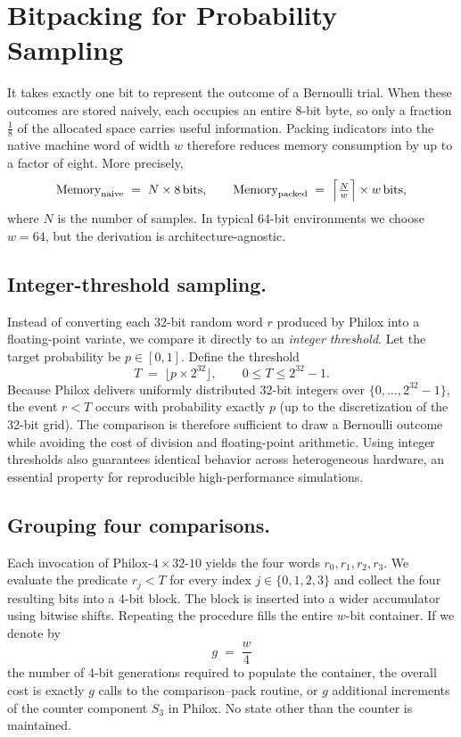 \section{Bitpacking for Probability Sampling}
\label{sec:bitpack-prob-sampling}

It takes exactly one bit to represent the outcome of a Bernoulli trial. When these outcomes are stored naively, each occupies an entire \(8\)-bit byte, so only a fraction \(\tfrac{1}{8}\) of the allocated space carries useful information. Packing indicators into the native machine word of width \(w\) therefore reduces memory consumption by up to a factor of eight. More precisely,
\[
  \text{Memory}_{\text{naive}} \;=\; N \times 8\,\text{bits},
  \qquad
  \text{Memory}_{\text{packed}} \;=\;\Bigl\lceil\tfrac{N}{w}\Bigr\rceil \times w\,\text{bits},
\]
where \(N\) is the number of samples. In typical 64-bit environments we choose \(w = 64\), but the derivation is architecture-agnostic.

\subsection{Integer-threshold sampling.}  Instead of converting each 32-bit random word \(r\) produced by Philox into a floating-point variate, we compare it directly to an \emph{integer threshold}.  Let the target probability be \(p \in [0,1]\).  Define the threshold
\[
   T \;=\; \bigl\lfloor p \times 2^{32} \bigr\rfloor,\qquad 0 \le T \le 2^{32}-1.
\]
Because Philox delivers uniformly distributed 32-bit integers over \(\{0,\dots,2^{32}-1\}\), the event \(r < T\) occurs with probability exactly \(p\) (up to the discretization of the 32-bit grid).  The comparison is therefore sufficient to draw a Bernoulli outcome while avoiding the cost of division and floating-point arithmetic.  Using integer thresholds also guarantees identical behavior across heterogeneous hardware, an essential property for reproducible high-performance simulations.

\subsection{Grouping four comparisons.}  Each invocation of \(\mathrm{Philox\text{-}4\times32\text{-}10}\) yields the four words \(r_0, r_1, r_2, r_3\).  We evaluate the predicate \(r_j < T\) for every index \(j \in \{0,1,2,3\}\) and collect the four resulting bits into a 4-bit block.  The block is inserted into a wider accumulator using bitwise shifts.  Repeating the procedure fills the entire \(w\)-bit container.  If we denote by
\[
   g \;=\; \frac{w}{4}
\]
 the number of 4-bit generations required to populate the container, the overall cost is exactly \(g\) calls to the comparison–pack routine, or \(g\) additional increments of the counter component \(S_3\) in Philox.  No state other than the counter is maintained.

